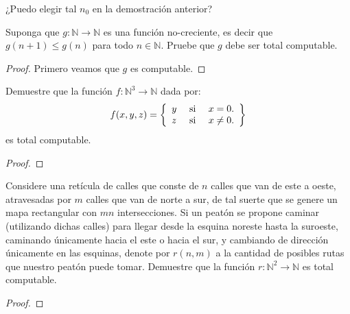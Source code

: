 \documentclass[12pt]{report}
\theoremstyle{largebreak}
\newcommand\cf[3]{\ensuremath{#1:#2\rightarrow#3}}
\begin{document}
    \begin{obs}
        ¿Puedo elegir tal $n_0$ en la demostración anterior?
    \end{obs}

    \begin{excer}
        Suponga que $\cf{g}{\mathbb{N}}{\mathbb{N}}$ es una función no-creciente, es decir que $g(n+1)\leq g(n)$ para todo $n\in\mathbb{N}$. Pruebe que $g$ debe ser total computable.
    \end{excer}

    \begin{proof}
        Primero veamos que $g$ es computable.
    \end{proof}

    \begin{excer}
        Demuestre que la función $\cf{f}{\mathbb{N}^3}{\mathbb{N}}$ dada por:
        \begin{equation*}
            f(x,y,z)=\left\{
                \begin{array}{lcr}
                    y & \textup{ si } & x=0.\\
                    z & \textup{ si } & x\neq0.\\
                \end{array}
            \right\}
        \end{equation*}
        es total computable.
    \end{excer}

    \begin{proof}
        
    \end{proof}

    \begin{excer}
        Considere una retícula de calles que conste de $n$ calles que van de este a oeste, atravesadas por $m$ calles que van de norte a sur, de tal suerte que se genere un mapa rectangular con $mn$ intersecciones. Si un peatón se propone caminar (utilizando dichas calles) para llegar desde la esquina noreste hasta la suroeste, caminando únicamente hacia el este o hacia el sur, y cambiando de dirección únicamente en las esquinas, denote por $r(n,m)$ a la cantidad de posibles rutas que nuestro peatón puede tomar. Demuestre que la función $\cf{r}{\mathbb{N}^2}{\mathbb{N}}$ es total computable.
    \end{excer}

    \begin{proof}
        
    \end{proof}
\end{document}
